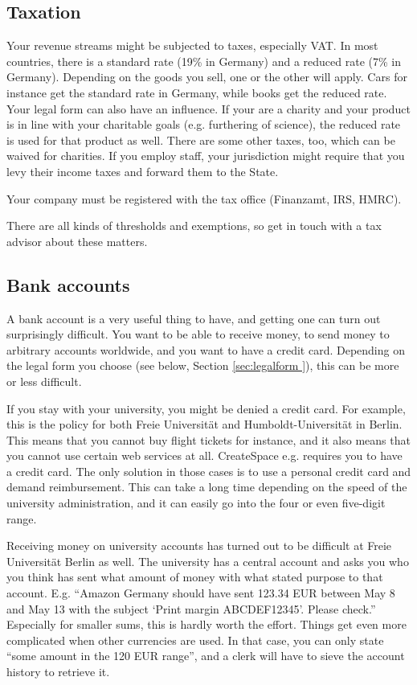 \documentclass[guidelines,nonflat,modfonts] {langsci/langscibook}
\begin{document}
\subsection{Taxation}
Your revenue streams might be subjected to taxes, especially VAT. In most countries, there is a standard rate (19\% in Germany) and a reduced rate (7\% in Germany). Depending on the goods you sell, one or the other will apply. Cars for instance get the standard rate in Germany, while books get the reduced rate. Your legal form can also have an influence. If your are a charity and your product is in line with your charitable goals (e.g. furthering of science), the reduced rate is used for that product as well. There are some other taxes, too, which can be waived for charities. If you employ staff, your jurisdiction might require that you levy their income taxes and forward them to the State.

Your company must be registered with the tax office (Finanzamt, IRS, HMRC).

There are all kinds of thresholds and exemptions, so get in touch with a tax advisor about these matters. 

\subsection{Bank accounts}
A bank account is a very useful thing to have, and getting one can turn out surprisingly difficult. You want to be able to receive money, to send money to arbitrary accounts worldwide, and you want to have a credit card. Depending on the legal form you choose (see below, Section \ref{sec:legalform }), this can be more or less difficult. 

If you stay with your university, you might be denied a credit card. For example, this is the policy for both Freie Universität and Humboldt-Universität in Berlin. This means that you cannot buy flight tickets for instance, and it also means that you cannot use certain web services at all. CreateSpace e.g. requires you to have a credit card. The only solution in those cases is to use a personal credit card and demand reimbursement. This can take a long time depending on the speed of the university administration, and it can easily go into the four or even five-digit range. 

Receiving money on university accounts has turned out to be difficult at Freie Universität Berlin as well. The university has a central account and asks you who you think has sent what amount of money with what stated purpose to that account. E.g. ``Amazon Germany should have sent 123.34 EUR between May 8 and May 13 with the subject `Print margin ABCDEF12345'. Please check.'' Especially for smaller sums, this is hardly worth the effort. Things get even more complicated when other currencies are used. In that case, you can only state ``some amount in the 120 EUR range'', and a clerk will have to sieve the account history to retrieve it. 
\end{document}
